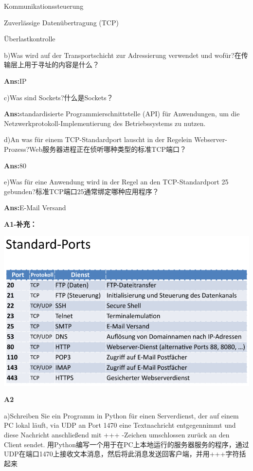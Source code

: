 \documentclass[fleqn]{article}
\begin{document}
\indent \indent Kommunikationssteuerung 

\indent \indent Zuverlässige Datenübertragung (TCP) 

\indent \indent Überlastkontrolle

b)Was wird auf der Transportschicht zur Adressierung verwendet und wofür?在传输层上用于寻址的内容是什么？

\textbf{Ans:}IP

c)Was sind Sockets?什么是Sockets？

\textbf{Ans:}standardisierte Programmierschnittstelle (API) für Anwendungen, um die Netzwerkprotokoll-Implementierung des Betriebssystems zu nutzen.

d)An was für einem TCP-Standardport lauscht in der Regelein Webserver-Prozess?Web服务器进程正在侦听哪种类型的标准TCP端口？

\textbf{Ans:}80

e)Was für eine Anwendung wird in der Regel an den TCP-Standardport 25 gebunden?标准TCP端口25通常绑定哪种应用程序？

\textbf{Ans:}E-Mail Versand

\textbf{A1-补充：}

\begin{center}
    \includegraphics[scale=0.5]{bild17.png}
\end{center}

\noindent\textbf{A2}

a)Schreiben Sie ein Programm in Python für einen Serverdienst, der auf einem PC lokal läuft, via UDP an Port 1470 eine Textnachricht entgegennimmt und diese Nachricht anschließend mit +++ -Zeichen umschlossen zurück an den Client sendet.
用Python编写一个用于在PC上本地运行的服务器服务的程序，通过UDP在端口1470上接收文本消息，然后将此消息发送回客户端，并用+++字符括起来
\end{document}

